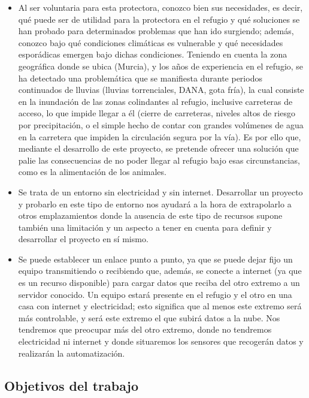 \documentclass[12pt]{article}
\begin{document}
	\begin{itemize}
		\item Al ser voluntaria para esta protectora, conozco bien sus necesidades, es decir, qué puede ser de utilidad para la protectora en el refugio y qué soluciones se han probado para determinados problemas que han ido surgiendo; además, conozco bajo qué condiciones climáticas es vulnerable y qué necesidades esporádicas emergen bajo dichas condiciones. Teniendo en cuenta la zona geográfica donde se ubica (Murcia), y los años de experiencia en el refugio, se ha detectado una problemática que se manifiesta durante  periodos continuados de lluvias (lluvias torrenciales, DANA, gota fría), la cual consiste en la inundación de las zonas colindantes al refugio, inclusive carreteras de acceso, lo que impide llegar a él (cierre de carreteras, niveles altos de riesgo por precipitación, o el simple hecho de contar con grandes volúmenes de agua en la carretera que impiden la circulación segura por la vía). Es por ello que, mediante el desarrollo de este proyecto, se pretende ofrecer una solución que palie las consecuencias de no poder llegar al refugio bajo esas circunstancias, como es la alimentación de los animales.
		\item Se trata de un entorno sin electricidad y sin internet. Desarrollar un proyecto y probarlo en este tipo de entorno nos ayudará a la hora de extrapolarlo a otros emplazamientos donde la ausencia de este tipo de recursos supone también una limitación y un aspecto a tener en cuenta para definir y desarrollar el proyecto en sí mismo.
		\item Se puede establecer un enlace punto a punto, ya que se puede dejar fijo un equipo transmitiendo o recibiendo que, además, se conecte a internet (ya que es un recurso disponible) para cargar datos que reciba del otro extremo a un servidor conocido. Un equipo estará presente en el refugio y el otro en una casa con internet y electricidad; esto significa que al menos este extremo será más controlable, y será este extremo el que subirá datos a la nube. Nos tendremos que preocupar más del otro extremo, donde no tendremos electricidad ni internet y donde situaremos los sensores que recogerán datos y realizarán la automatización.
	\end{itemize}
	
	\subsection[Objetivos del trabajo]{Objetivos del trabajo}
	
\end{document}
